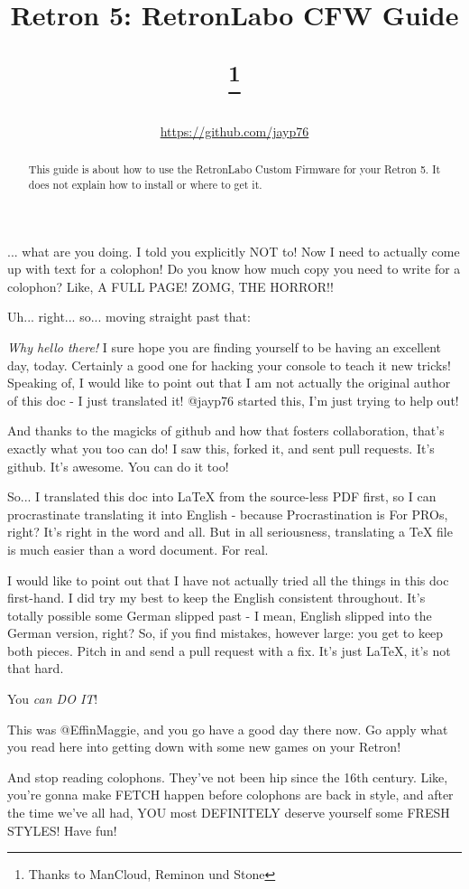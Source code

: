 \documentclass[a4paper]{article}
\title{Retron 5: RetronLabo CFW Guide
\author{\url{https://github.com/jayp76}}
\thanks{Thanks to ManCloud, Reminon und Stone}}
\begin{document}
\sffamily

\maketitle

\begin{abstract}
This guide is about how to use the RetronLabo Custom Firmware for your Retron 5. It does not explain how to install or where to get it.
\end{abstract}


\tableofcontents

\listoffigures

\listoftables

\begin{colophon}
... what are you doing. I told you explicitly NOT to! Now I need to actually come up with text for a colophon! Do you know how much copy you need to write for a colophon? Like, A FULL PAGE! ZOMG, THE HORROR!!\footnotemark

Uh... right... so... moving straight past that:

\emph{Why hello there!} I sure hope you are finding yourself to be having an excellent day, today. Certainly a good one for hacking your console to teach it new tricks! Speaking of, I would like to point out that I am not actually the original author of this doc - I just translated it! @jayp76 started this, I'm just trying to help out!

And thanks to the magicks of github and how that fosters collaboration, that's exactly what you too can do! I saw this, forked it, and sent pull requests. It's github. It's awesome. You can do it too!

So... I translated this doc into LaTeX from the source-less PDF first, so I can procrastinate translating it into English - because Procrastination is For PROs, right? It's right in the word and all. But in all seriousness, translating a TeX file is much easier than a word document. For real.

I would like to point out that I have not actually tried all the things in this doc first-hand. I did try my best to keep the English consistent throughout. It's totally possible some German slipped past - I mean, English slipped into the German version, right? So, if you find mistakes, however large: you get to keep both pieces. Pitch in and send a pull request with a fix. It's just LaTeX, it's not that hard.

You \emph{can DO IT}!

This was @EffinMaggie, and you go have a good day there now. Go apply what you read here into getting down with some new games on your Retron!

And stop reading colophons. They've not been hip since the 16th century. Like, you're gonna make FETCH happen before colophons are back in style, and after the time we've all had, YOU most DEFINITELY deserve yourself some FRESH STYLES! Have fun!

\end{colophon}
\end{document}
